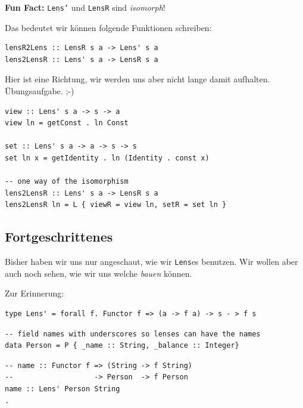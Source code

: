 \documentclass{beamer}
\begin{document}

\begin{frame}[fragile]

\textbf{Fun Fact:} \texttt{Lens'} und \texttt{LensR} sind \emph{isomorph}!
\pause
\smallskip\smallskip

Das bedeutet wir können folgende Funktionen schreiben:

\begin{verbatim}
lensR2Lens :: LensR s a -> Lens' s a
lens2LensR :: Lens' s a -> LensR s a
\end{verbatim}
\bigskip
\pause

Hier ist eine Richtung, wir werden uns aber nicht lange damit aufhalten. Übungsaufgabe. ;-)

\begin{verbatim}
view :: Lens' s a -> s -> a
view ln = getConst . ln Const

set :: Lens' s a -> a -> s -> s
set ln x = getIdentity . ln (Identity . const x)

-- one way of the isomorphism
lens2LensR :: Lens' s a -> LensR s a
lens2LensR ln = L { viewR = view ln, setR = set ln }
\end{verbatim}
 
\end{frame}

\subsection{Fortgeschrittenes}

\begin{frame}[fragile]

Bisher haben wir uns nur angeschaut, wie wir \texttt{Lens}es benutzen. Wir wollen aber auch noch sehen, wie wir uns welche \emph{bauen} können.
\pause
\smallskip
\smallskip

Zur Erinnerung:
\begin{verbatim}
type Lens' = forall f. Functor f => (a -> f a) -> s - > f s
\end{verbatim}
\pause
\smallskip

\begin{verbatim}
-- field names with underscores so lenses can have the names
data Person = P { _name :: String, _balance :: Integer}
\end{verbatim}
\pause
\bigskip

\begin{verbatim}
-- name :: Functor f => (String -> f String)
--                   -> Person  -> f Person
name :: Lens' Person String
.
\end{verbatim}

\end{frame}
\end{document}
